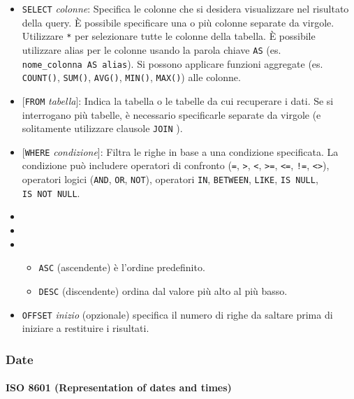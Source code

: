 \documentclass[
]{article}
\providecommand{\tightlist}{%
  \setlength{\itemsep}{0pt}\setlength{\parskip}{0pt}}
\begin{document}
\begin{itemize}
\tightlist
\item
  \texttt{SELECT} \emph{colonne}: Specifica le colonne che si desidera
  visualizzare nel risultato della query. È possibile specificare una o
  più colonne separate da virgole. Utilizzare \texttt{*} per selezionare
  tutte le colonne della tabella. È possibile utilizzare alias per le
  colonne usando la parola chiave \texttt{AS} (es.
  \texttt{nome\_colonna\ AS\ alias}). Si possono applicare funzioni
  aggregate (es. \texttt{COUNT()}, \texttt{SUM()}, \texttt{AVG()},
  \texttt{MIN()}, \texttt{MAX()}) alle colonne.
\item
  {[}\texttt{FROM} \emph{tabella}{]}: Indica la tabella o le tabelle da
  cui recuperare i dati. Se si interrogano più tabelle, è necessario
  specificarle separate da virgole (e solitamente utilizzare clausole
  \texttt{JOIN} ).
\item
  {[}\texttt{WHERE} \emph{condizione}{]}: Filtra le righe in base a una
  condizione specificata. La condizione può includere operatori di
  confronto (\texttt{=}, \texttt{\textgreater{}}, \texttt{\textless{}},
  \texttt{\textgreater{}=}, \texttt{\textless{}=}, \texttt{!=},
  \texttt{\textless{}\textgreater{}}), operatori logici (\texttt{AND},
  \texttt{OR}, \texttt{NOT}), operatori \texttt{IN}, \texttt{BETWEEN},
  \texttt{LIKE}, \texttt{IS\ NULL}, \texttt{IS\ NOT\ NULL}.
\item
\item
\item
  \begin{itemize}
  \tightlist
  \item
    \texttt{ASC} (ascendente) è l'ordine predefinito.
  \item
    \texttt{DESC} (discendente) ordina dal valore più alto al più basso.
  \end{itemize}
\item
  \texttt{OFFSET} \emph{inizio} (opzionale) specifica il numero di righe
  da saltare prima di iniziare a restituire i risultati.
\end{itemize}

\subsubsection{Date}\label{date}

\paragraph{ISO 8601 (Representation of dates and
times)}\label{iso-8601-representation-of-dates-and-times}
\end{document}
